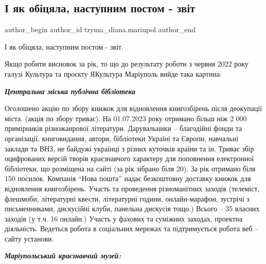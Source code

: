  
 
 
 
 

\subsection{І як обіцяла, наступним постом - звіт}
\label{sec:02_07_2023.fb.tryma_diana.mariupol.1.zvit_jakultura_mariupol}

\ifcmt
 author_begin
   author_id tryma_diana.mariupol
 author_end
\fi

І як обіцяла, наступним постом - звіт.

Якщо робити висновок за рік, то що до результату роботи з червня 2022 року
галузі Культура та проєкту ЯКультура Маріуполь вийде така картина: 

\emph{\color{blue}\bfseries Центральна міська публічна бібліотека}

Оголошено акцію по збору книжок для відновлення книгозбірень після деокупації
міста. (акція по збору триває). На 01.07.2023 року отримано більш ніж 2 000
примірників різножанрової літератури. Дарувальники – благодійні фонди та
організації, книговидання, автори, бібліотеки Україні та Європи, навчальні
заклади та ВНЗ, не байдужі українці з різних куточків країни та ін. Триває збір
оцифрованих версій творів краєзнавчого характеру для поповнення електронної
бібліотеки, що розміщена на сайті (за рік зібрано біля 20). За рік отримано
біля 150 посилок. Компанія \enquote{Нова пошта} надає безкоштовну доставку книжок для
відновлення книгозбірень. Участь та проведення  різноманітних заходів
(телеміст, флешмоби, літературні квести, літературні години, онлайн-марафон,
зустрічі з письменниками, дискусійні клуби, панельна дискусія тощо.) Всього –
35 власних заходів (у т.ч. 16 онлайн.) Участь у фахових та суміжних заходах,
проектна діяльність. Ведеться робота в соціальних мережах та підтримується
робота веб – сайту установи.

\emph{\color{blue}\bfseries Маріупольський краєзнавчий музей:}

